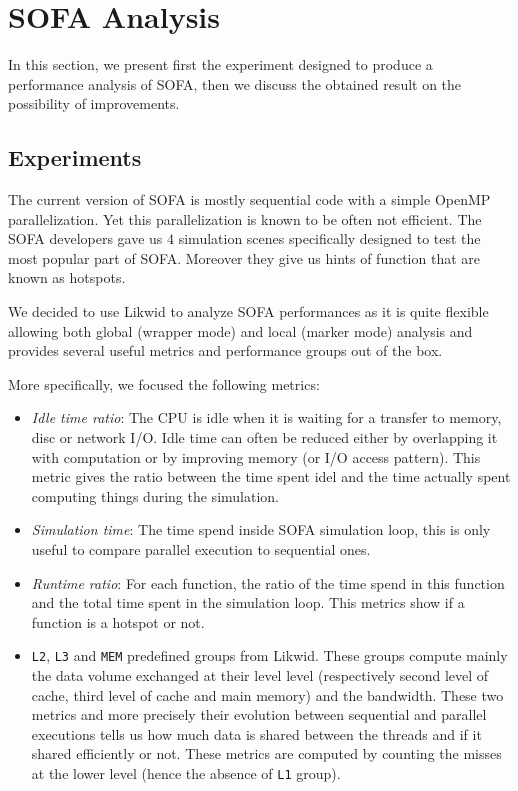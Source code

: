 \section{SOFA Analysis}
\label{sec:sofa}

In this section, we present first the experiment designed to produce a performance analysis of \gls{SOFA}, then we discuss the obtained result on the possibility of improvements.

\subsection{Experiments}

The current version of \gls{SOFA} is mostly sequential code with a simple \gls{OpenMP} parallelization.
Yet this parallelization is known to be often not efficient.
The \gls{SOFA} developers gave us $4$ simulation scenes specifically designed to test the most popular part of \gls{SOFA}.
Moreover they give us hints of function that are known as hotspots.

We decided to use \gls{Likwid} to analyze \gls{SOFA} performances as it is quite flexible allowing both global (wrapper mode) and local (marker mode) analysis and provides several useful metrics and performance groups out of the box.

More specifically, we focused the following metrics:
\begin{itemize}
    \item \emph{Idle time ratio}: The CPU is idle when it is waiting for a transfer to memory,  disc or network \gls{I/O}.
        Idle time can often be reduced either by overlapping it with computation or by improving memory (or \gls{I/O} access pattern).
        This metric gives the ratio between the time spent idel and the time actually spent computing things during the simulation.
    \item \emph{Simulation time}: The time spend inside \gls{SOFA} simulation loop, this is only useful to compare parallel execution to sequential ones.
    \item \emph{Runtime ratio}: For each function, the ratio of the time spend in this function and the total time spent in the simulation loop.
        This metrics show if a function is a hotspot or not.
    \item \texttt{L2}, \texttt{L3} and \texttt{MEM} predefined groups from \gls{Likwid}. These groups compute mainly the data volume exchanged at their level level (respectively second level of cache, third level of cache and main memory) and the bandwidth.
        These two metrics and more precisely their evolution between sequential and parallel executions tells us how much data is shared between the threads and if it shared efficiently or not.
        These metrics are computed by counting the misses at the lower level (hence the absence of \texttt{L1} group).
\end{itemize}

